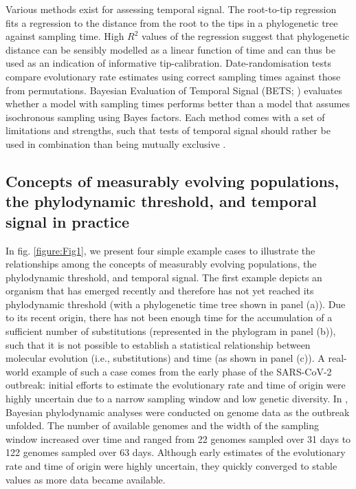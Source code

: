 \documentclass[11pt]{article}
\begin{document}
Various methods exist for assessing temporal signal. The root-to-tip regression \citep{buonagurio1986evolution, gojobori1990molecular, drummond2003inference} fits a regression to the distance from the root to the tips in a phylogenetic tree against sampling time. High $R^2$ values of the regression suggest that phylogenetic distance can be sensibly modelled as a linear function of time and can thus be used as an indication of informative tip-calibration. Date-randomisation tests \citep{ramsden2009hantavirus, duchene2015performance, duchene2018inferring, trovao2015host} compare evolutionary rate estimates using correct sampling times against those from permutations. Bayesian Evaluation of Temporal Signal (BETS; \cite{duchene2020bayesian}) evaluates whether a model with sampling times performs better than a model that assumes isochronous sampling using Bayes factors. Each method comes with a set of limitations and strengths, such that tests of temporal signal should rather be used in combination than being mutually exclusive \citep{rieux2016inferences, duchene2020bayesian}.

\subsection{Concepts of measurably evolving populations, the phylodynamic threshold, and temporal signal in practice}
In fig. \ref{figure:Fig1}, we present four simple example cases to illustrate the relationships among the concepts of measurably evolving populations, the phylodynamic threshold, and temporal signal. The first example depicts an organism that has emerged recently and therefore has not yet reached its phylodynamic threshold (with a phylogenetic time tree shown in panel (a)). Due to its recent origin, there has not been enough time for the accumulation of a sufficient number of substitutions (represented in the phylogram in panel (b)), such that it is not possible to establish a statistical relationship between molecular evolution (i.e., substitutions) and time (as shown in panel (c)). A real-world example of such a case comes from the early phase of the SARS-CoV-2 outbreak: initial efforts to estimate the evolutionary rate and time of origin were highly uncertain due to a narrow sampling window and low genetic diversity. In \cite{duchene2020temporal}, Bayesian phylodynamic analyses were conducted on genome data as the outbreak unfolded. The number of available genomes and the width of the sampling window increased over time and ranged from 22 genomes sampled over 31 days to 122 genomes sampled over 63 days. Although early estimates of the evolutionary rate and time of origin were highly uncertain, they quickly converged to stable values as more data became available. 
   
\end{document}
